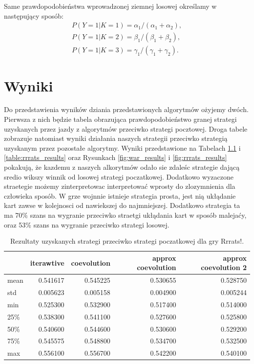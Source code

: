 \documentclass[inzynierska]{pwr_wmat_praca_dyplomowa}
\theoremstyle{plain}
\numberwithin{theorem}{chapter}
\theoremstyle{definition}
\numberwithin{theorem}{chapter}
\begin{document}
		Same prawdopodobieństwa wprowadzonej ziemnej losowej określamy w następujący sposób:  
		\begin{gather*}
			 P(Y = 1|K=1) = \alpha_1/(\alpha_1+\alpha_2),\\
			 P(Y = 1|K=2) = \beta_1/(\beta_1+\beta_2),\\
			 P(Y = 1|K=3) = \gamma_1/(\gamma_1+\gamma_2). 
		\end{gather*}


	
	\chapter{Wyniki}
	Do przedstawienia wyników dziania przedstawionych algorytmów ożyjemy dwóch. Pierwsza z nich będzie tabela obrazująca prawdopodobieństwo granej strategi uzyskanych przez jazdy z algorytmów przeciwko strategi pocztowej. Droga tabele zobrazuje natomiast wyniki działania naszych strategii przeciwko strategią uzyskanym przez pozostałe algorytmy.
	Wyniki przedstawione na Tabelach \ref{table:war_results} i \ref{table:rrrats_results} oraz Rysunkach \ref{fig:war_results} i \ref{fig:rrrats_results} pokakują, że kazdemu z naszych alkorytmów odało sie zdaleśc strategie dającą sredio wikszy winnik od losowej strategi poczatkowej. Dodatkowo wyzaczone straetegie możemy zinterpretowac interpretować wprosty do zlozymnienia dla człowieka sposób.
	W grze wojnnie istnieje strategia prosta, jest nią ukłądanie kart zawse w kolejnosci od nawiekszej do najmniejszej. Dodatkowo strategia ta ma 70\% szans na wygranie przeciwko straetgi ukłądania kart w sposób malejaćy, oraz 53\% szans na wygranie przeciwko strategi losowej.
	\begin{table}[h]
		\begin{center}
			\begin{tabular}{lrrrr}
				\toprule
				{} &  iterawtive &  coevolution &  approx coevolution &  approx coevolution 2 \\
				\midrule
				mean  &    0.541617 &     0.545225 &             0.530655 &               0.528750 \\
				std   &    0.005623 &     0.005158 &             0.004900 &               0.005244 \\
				min   &    0.525300 &     0.532900 &             0.517400 &               0.514000 \\
				25\%   &    0.538300 &     0.541100 &             0.527600 &               0.525800 \\
				50\%   &    0.540600 &     0.544600 &             0.530600 &               0.529200 \\
				75\%   &    0.545575 &     0.548800 &             0.534700 &               0.532500 \\
				max   &    0.556100 &     0.556700 &             0.542200 &               0.540100 \\
				\bottomrule
			\end{tabular}
			\caption{Rezultaty uzyskanych strategi przeciwko strategi poczatkowej dla gry Rrrats!.}
			\label{table:war_results}
		\end{center}
	\end{table}
\end{document}

